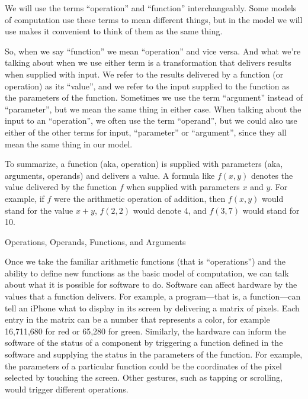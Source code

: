 \begin{aside}
We will use the terms ``operation'' and ``function'' interchangeably.
Some models of computation use these terms to mean different things, but in the model we will use makes it convenient to think of them as the same thing.

So, when we say ``function'' we mean ``operation'' and vice versa. And what we're talking about when we use either term is a transformation that delivers results when supplied with input. We refer to the results delivered by a function (or operation) as its ``value'', and we refer to the input supplied to the function as the parameters of the function. Sometimes we use the term ``argument'' instead of ``parameter'', but we mean the same thing in either case. When talking about the input to an ``operation'', we often use the term ``operand'', but we could also use either of the other terms for input, ``parameter'' or ``argument'', since they all mean the same thing in our model.

To summarize, a function (aka, operation) is supplied with parameters (aka, arguments, operands) and delivers a value.
A formula like $f(x,y)$ denotes the value delivered by the function $f$ when supplied with parameters $x$ and $y$. For example, if $f$ were the arithmetic operation of addition, then $f(x,y)$ would stand for the value $x+y$, $f(2,2)$ would denote 4, and $f(3,7)$ would stand for 10.

\caption{Operations, Operands, Functions, and Arguments}
\label{operations-and-functions}
\end{aside}

Once we take the familiar arithmetic functions (that is ``operations'') and the ability to define new functions
as the basic model of computation, we can talk about what it is possible for software to do.
Software can affect
hardware by the values that a function delivers.  For example,
a program---that is, a function---can tell an iPhone what to display
in its screen by delivering a matrix of pixels.  Each entry in the matrix
can be a number that represents a color, for example 16,711,680 for
red or 65,280 for green.  Similarly, the hardware can inform the
software of the status of a component by triggering a function defined in the software and supplying the status in the parameters of the function.
For example, the parameters of a particular function could be the coordinates of the pixel selected by touching the screen.  Other gestures, such as tapping or
scrolling, would trigger different operations.

